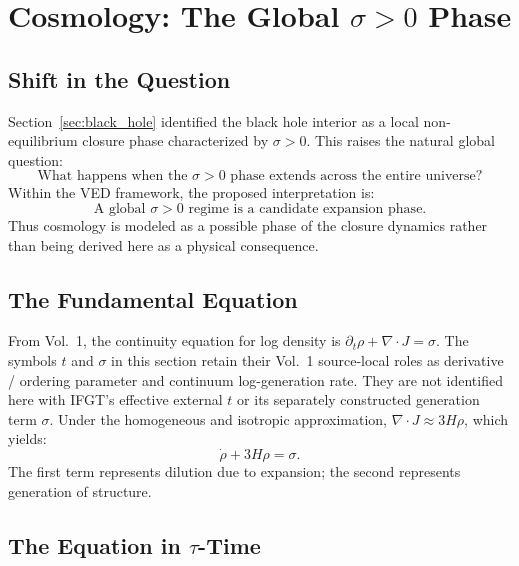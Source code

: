 \section{Cosmology: The Global $\sigma > 0$ Phase}
\label{sec:cosmology}

\subsection{Shift in the Question}

Section~\ref{sec:black_hole} identified the black hole interior as a local
non-equilibrium closure phase characterized by $\sigma > 0$.
This raises the natural global question:
\begin{equation}
  \boxed{
    \text{What happens when the } \sigma > 0
    \text{ phase extends across the entire universe?}
  }
\end{equation}
Within the VED framework, the proposed interpretation is:
\begin{equation}
  \boxed{\text{A global } \sigma > 0 \text{ regime is a candidate expansion phase.}}
\end{equation}
Thus cosmology is modeled as a possible phase of the closure dynamics rather
than being derived here as a physical consequence.

\subsection{The Fundamental Equation}

From Vol.~1, the continuity equation for log density is
$\partial_t \rho + \nabla \cdot J = \sigma$.
The symbols $t$ and $\sigma$ in this section retain their Vol.~1 source-local
roles as derivative / ordering parameter and continuum log-generation rate.
They are not identified here with IFGT's effective external $t$ or its
separately constructed generation term $\sigma$.
Under the homogeneous and isotropic approximation,
$\nabla \cdot J \approx 3H\rho$, which yields:
\begin{equation}
  \label{eq:continuity_cosmo}
  \boxed{\dot{\rho} + 3H\rho = \sigma.}
\end{equation}
The first term represents dilution due to expansion;
the second represents generation of structure.

\subsection{The Equation in $\tau$-Time}

